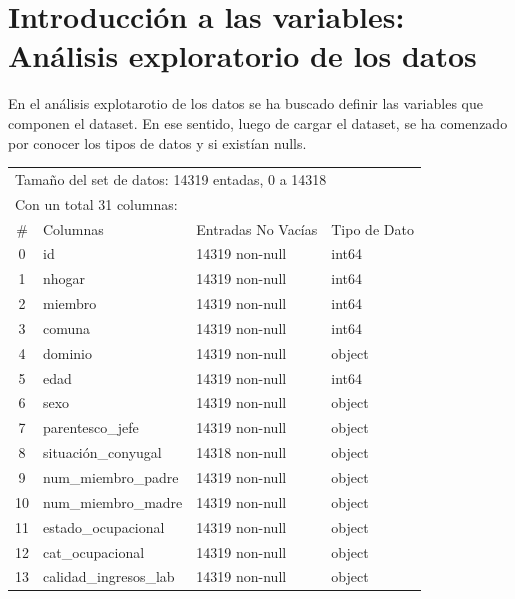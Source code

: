 \documentclass[a4paper]{article}
\begin{document}
\newpage

\section{Introducción a las variables: Análisis exploratorio de los datos}
 
    En el análisis explotarotio de los datos se ha buscado definir las variables que componen el dataset. En ese sentido, luego de cargar el dataset, se ha comenzado por conocer los tipos de datos y si existían nulls.
   
    \begin{table}[H]\begin{center}
    \begin{tabular}{clll}
    \multicolumn{4}{l}{Tamaño del set de datos: 14319 entadas, 0 a 14318} \\
    \multicolumn{4}{l}{Con un total 31 columnas:}  \\
    \toprule
    \#  & Columnas                   & Entradas No Vacías & Tipo de Dato \\ \midrule
    0  & id                          & 14319 non-null & int64 \\
    1  & nhogar                      & 14319 non-null & int64 \\
    2  & miembro                     & 14319 non-null & int64 \\
    3  & comuna                      & 14319 non-null & int64 \\
    4  & dominio                     & 14319 non-null & object \\
    5  & edad                        & 14319 non-null & int64 \\
    6  & sexo                        & 14319 non-null & object \\
    7  & parentesco\_jefe             & 14319 non-null & object \\
    8  & situación\_conyugal          & 14318 non-null & object \\
    9  & num\_miembro\_padre           & 14319 non-null & object \\
    10 & num\_miembro\_madre           & 14319 non-null & object \\
    11 & estado\_ocupacional          & 14319 non-null & object \\
    12 & cat\_ocupacional             & 14319 non-null & object \\
    13 & calidad\_ingresos\_lab        & 14319 non-null & object \\

\end{tabular}
\end{center}
\end{table}
\end{document}

